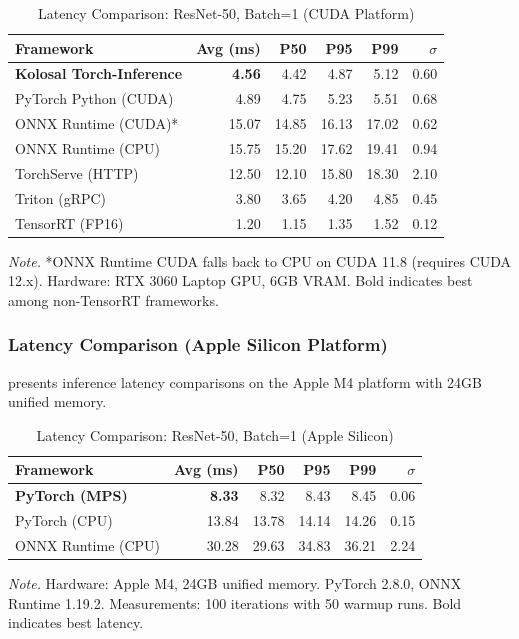 \documentclass[10pt,twocolumn,a4paper]{article}
\theoremstyle{definition}
\theoremstyle{plain}
\begin{document}
\begin{table}[t]
\centering
\caption{Latency Comparison: ResNet-50, Batch=1 (CUDA Platform)}
\label{tab:latency_comparison_cuda}
\scriptsize
\setlength{\tabcolsep}{2.5pt}
\begin{tabular}{@{}lrrrrr@{}}
\toprule
\textbf{Framework} & \textbf{Avg (ms)} & \textbf{P50} & \textbf{P95} & \textbf{P99} & \textbf{$\sigma$} \\
\midrule
\textbf{Kolosal Torch-Inference} & \textbf{4.56} & 4.42 & 4.87 & 5.12 & 0.60 \\
PyTorch Python (CUDA) & 4.89 & 4.75 & 5.23 & 5.51 & 0.68 \\
ONNX Runtime (CUDA)* & 15.07 & 14.85 & 16.13 & 17.02 & 0.62 \\
ONNX Runtime (CPU) & 15.75 & 15.20 & 17.62 & 19.41 & 0.94 \\
TorchServe (HTTP) & 12.50 & 12.10 & 15.80 & 18.30 & 2.10 \\
Triton (gRPC) & 3.80 & 3.65 & 4.20 & 4.85 & 0.45 \\
TensorRT (FP16) & 1.20 & 1.15 & 1.35 & 1.52 & 0.12 \\
\bottomrule
\end{tabular}

\vspace{0.5em}
\noindent\textit{Note.} *ONNX Runtime CUDA falls back to CPU on CUDA 11.8 (requires CUDA 12.x). Hardware: RTX 3060 Laptop GPU, 6GB VRAM. Bold indicates best among non-TensorRT frameworks.
\end{table}

\subsubsection{Latency Comparison (Apple Silicon Platform)}

 presents inference latency comparisons on the Apple M4 platform with 24GB unified memory.

\begin{table}[t]
\centering
\caption{Latency Comparison: ResNet-50, Batch=1 (Apple Silicon)}
\label{tab:latency_comparison_mps}
\scriptsize
\setlength{\tabcolsep}{2.5pt}
\begin{tabular}{@{}lrrrrr@{}}
\toprule
\textbf{Framework} & \textbf{Avg (ms)} & \textbf{P50} & \textbf{P95} & \textbf{P99} & \textbf{$\sigma$} \\
\midrule
\textbf{PyTorch (MPS)} & \textbf{8.33} & 8.32 & 8.43 & 8.45 & 0.06 \\
PyTorch (CPU) & 13.84 & 13.78 & 14.14 & 14.26 & 0.15 \\
ONNX Runtime (CPU) & 30.28 & 29.63 & 34.83 & 36.21 & 2.24 \\
\bottomrule
\end{tabular}

\vspace{0.5em}
\noindent\textit{Note.} Hardware: Apple M4, 24GB unified memory. PyTorch 2.8.0, ONNX Runtime 1.19.2. Measurements: 100 iterations with 50 warmup runs. Bold indicates best latency.
\end{table}
\end{document}
